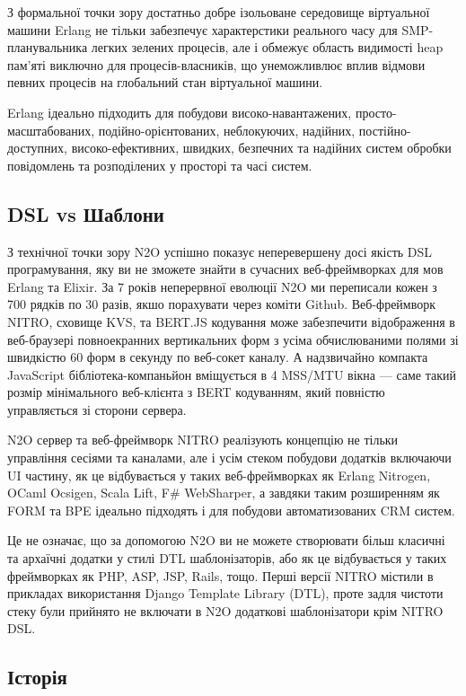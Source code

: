 З формальної точки зору достатньо добре ізольоване середовище віртуальної
машини Erlang не тільки забезпечує характерстики реального часу для
SMP-планувальника легких зелених процесів, але і обмежує область видимості
heap пам'яті виключно для процесів-власників, що унеможливлює вплив відмови
певних процесів на глобальний стан віртуальної машини.

Erlang ідеально підходить для побудови високо-навантажених,
просто-масштабованих, подійно-орієнтованих, неблокуючих, надійних,
постійно-доступних, високо-ефективних, швидких, безпечних та надійних
систем обробки повідомлень та розподілених у просторі та часі систем.

\subsection{DSL vs Шаблони}

З технічної точки зору N2O успішно показує неперевершену досі якість
DSL програмування, яку ви не зможете знайти в сучасних веб-фреймворках
для мов Erlang та Elixir. За 7 років неперервної еволюції N2O ми переписали
кожен з 700 рядків по 30 разів, якшо порахувати через коміти Github.
Веб-фреймворк NITRO, сховище KVS, та BERT.JS кодування може забезпечити
відображення в веб-браузері повноекранних вертикальних форм з усіма
обчислюваними полями зі швидкістю 60 форм в секунду по веб-сокет каналу.
А надзвичайно компакта JavaScript бібліотека-компаньйон вміщується
в 4 MSS/MTU вікна — саме такий розмір мінімального веб-клієнта з BERT
кодуванням, який повністю управляється зі сторони сервера.

N2O сервер та веб-фреймворк NITRO реалізують концепцію не тільки
управління сесіями та каналами, але і усім стеком побудови додатків
включаючи UI частину, як це відбувається у таких веб-фреймворках як
Erlang Nitrogen, OCaml Ocsigen, Scala Lift, F# WebSharper, а завдяки
таким розширенням як FORM та BPE ідеально підходять і для побудови
автоматизованих CRM систем.

Це не означає, що за допомогою N2O ви не можете створювати більш
класичні та архаїчні додатки у стилі DTL шаблонізаторів, або як це
відбувається у таких фреймворках як PHP, ASP, JSP, Rails, тощо.
Перші версії NITRO містили в прикладах використання Django Template
Library (DTL), проте задля чистоти стеку були прийнято не включати
в N2O додаткові шаблонізатори крім NITRO DSL.

\subsection{Історія}

